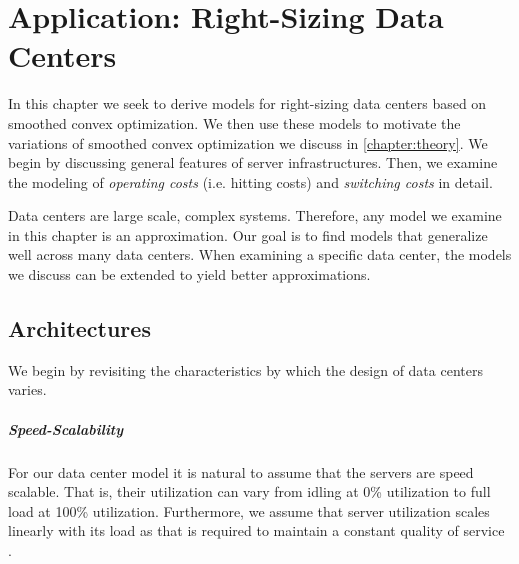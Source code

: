 
\chapter{Application: Right-Sizing Data Centers}\label{chapter:application}

In this chapter we seek to derive models for right-sizing data centers based on smoothed convex optimization. We then use these models to motivate the variations of smoothed convex optimization we discuss in \autoref{chapter:theory}. We begin by discussing general features of server infrastructures. Then, we examine the modeling of \textit{operating costs} (i.e. hitting costs) and \textit{switching costs} in detail.

Data centers are large scale, complex systems. Therefore, any model we examine in this chapter is an approximation. Our goal is to find models that generalize well across many data centers. When examining a specific data center, the models we discuss can be extended to yield better approximations.

\section{Architectures}\label{section:application:architectures}

We begin by revisiting the characteristics by which the design of data centers varies.

\paragraph{Speed-Scalability} For our data center model it is natural to assume that the servers are speed scalable. That is, their utilization can vary from idling at 0\% utilization to full load at 100\% utilization. Furthermore, we assume that server utilization scales linearly with its load as that is required to maintain a constant quality of service \cite{Bansal2015}.

